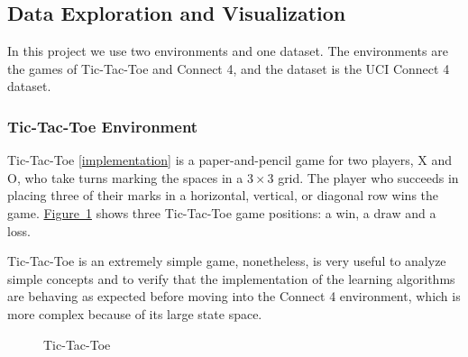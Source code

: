 \documentclass{article}
\newcommand{\GithubURL}[1]{[\href{https://github.com/davidrobles/mlnd-capstone-code/blob/master/#1}{implementation}]}
\begin{document}
\subsection{Data Exploration and Visualization}

In this project we use two environments and one dataset. The environments are the games of
Tic-Tac-Toe and Connect 4, and the dataset is the UCI Connect 4 dataset.

\subsubsection{Tic-Tac-Toe Environment}

Tic-Tac-Toe \GithubURL{capstone/game/games/tictactoe.py} is a paper-and-pencil game for two players,
X and O, who take turns marking the spaces in a $3 \times 3$ grid. The player who succeeds in
placing three of their marks in a horizontal, vertical, or diagonal row wins the game.
\hyperref[fig:tic-env]{Figure~\ref*{fig:tic-env}} shows three Tic-Tac-Toe game positions: a win, a
draw and a loss.

Tic-Tac-Toe is an extremely simple game, nonetheless, is very useful to analyze simple concepts and
to verify that the implementation of the learning algorithms are behaving as expected before moving
into the Connect 4 environment, which is more complex because of its large state space.


\begin{figure}[!b]
    \centering
     \hspace{0.2in}
     \hspace{0.2in}
    \caption{Tic-Tac-Toe}
    \label{fig:tic-env}
\end{figure}
\end{document}
